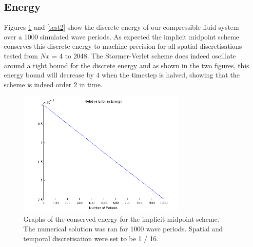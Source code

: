 \documentclass[a4paper,11pt]{article}
\begin{document}
\subsection{Energy}

Figures \ref{test} and \ref{test2} show the discrete energy of our compressible fluid system over a 1000 simulated wave periods. As expected the implicit midpoint scheme conserves this discrete energy to machine precision for all spatial discretisations tested from $Nx$ = 4 to 2048.  The Stormer-Verlet scheme does indeed oscillate around a tight bound for the discrete energy and as shown in the two figures, this energy bound will decrease by 4 when the timestep is halved, showing that the scheme is indeed order 2 in time. 

\begin{figure}
    \centering
    \includegraphics[width=0.75\textwidth]{error1.png}
       \caption{Graphs of the conserved energy for the implicit midpoint scheme. The numerical solution was ran for 1000 wave periods. Spatial and temporal  discretisation were set to be 1 / 16. }
        \label{test}
\end{figure}
\end{document}
